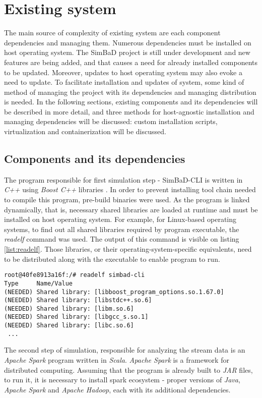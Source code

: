\chapter{Existing system}
\label{chapter:2}
The main source of complexity of existing system are each component dependencies and managing them. Numerous dependencies must be installed on host operating system. The SimBaD project is still under development and new features are being added, and that causes a need for already installed components to be updated. Moreover, updates to host operating system may also evoke a need to update. To facilitate installation and updates of system, some kind of method of managing the project with its dependencies and managing distribution is needed. In the following sections, existing components and its dependencies will be described in more detail, and three methods for host-agnostic installation and managing dependencies will be discussed: custom installation scripts, virtualization and containerization  will be discussed.
\section{Components and its dependencies}
 The program responsible for first simulation step - SimBaD-CLI is written in \textit{C++} using \textit{Boost C++} libraries \cite{Schling2011}. In order to prevent installing tool chain needed to compile this program, pre-build binaries were used. As the program is linked dynamically, that is, necessary shared libraries are loaded at runtime and must be installed on host operating system. For example, for Linux-based operating systems, to find out all shared libraries required by program executable, the \textit{readelf} command was used. The output of this command is visible on listing \ref{list:readelf}. Those libraries, or their operating-system-specific equivalents, need to be distributed along with the executable to enable program to run. 
\begin{lstlisting}[label=list:readelf,caption=The output of readelf command (Tag column ommited), basicstyle=\footnotesize\ttfamily]
root@40fe8913a16f:/# readelf simbad-cli 
Type     Name/Value
(NEEDED) Shared library: [libboost_program_options.so.1.67.0]
(NEEDED) Shared library: [libstdc++.so.6]
(NEEDED) Shared library: [libm.so.6]
(NEEDED) Shared library: [libgcc_s.so.1]
(NEEDED) Shared library: [libc.so.6]
 ...
\end{lstlisting}

The second step of simulation, responsible for analyzing the stream data is an \textit{Apache Spark} program written in \textit{Scala}. \textit{Apache Spark} is a framework for distributed computing. Assuming that the program is already built to \textit{JAR} files, to run it, it is necessary to install spark ecosystem - proper versions of \textit{Java}, \textit{Apache Spark} and \textit{Apache Hadoop}, each with its additional dependencies.

